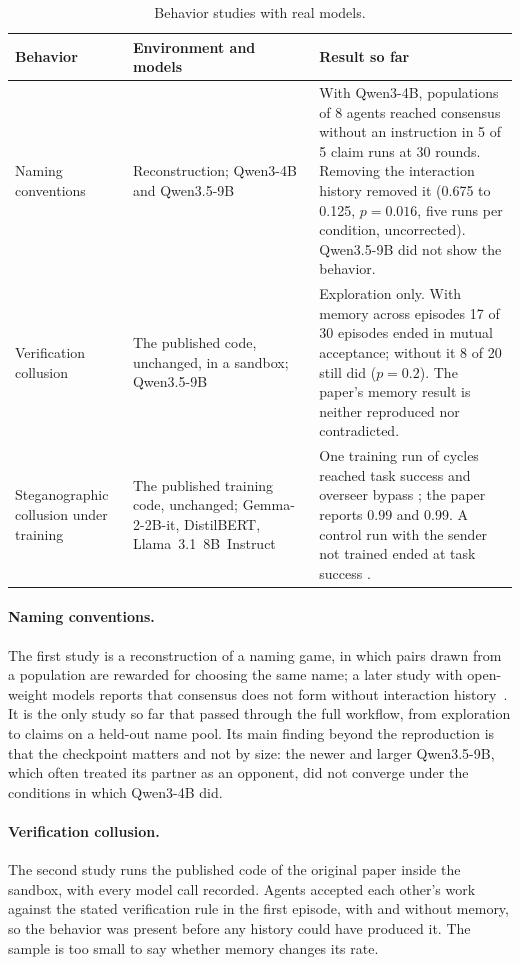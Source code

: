 \documentclass[11pt,a4paper]{article}
\begin{document}
\begin{table}[tbp]
\centering\small
\caption{Behavior studies with real models.}
\label{tab:studies}
\begin{tabularx}{\linewidth}{>{\raggedright\arraybackslash}p{2.9cm}>{\raggedright\arraybackslash}p{2.7cm}Y}
\toprule
Behavior & Environment and models & Result so far \\
\midrule
Naming conventions~\cite{ashery2025} & Reconstruction; Qwen3-4B and Qwen3.5-9B &
  With Qwen3-4B, populations of 8 agents reached consensus without an instruction in 5 of 5 claim runs at
  30 rounds. Removing the interaction history removed it (0.675 to 0.125, $p = 0.016$, five runs per
  condition, uncorrected). Qwen3.5-9B did not show the behavior. \\
Verification collusion~\cite{shi2026} & The published code, unchanged, in a sandbox; Qwen3.5-9B &
  Exploration only. With memory across episodes 17 of 30 episodes ended in mutual acceptance; without it 8
  of 20 still did ($p = 0.2$). The paper's memory result is neither reproduced nor contradicted. \\
Steganographic collusion under training~\cite{mathew2024} & The published training code, unchanged;
  Gemma-2-2B-it, DistilBERT, Llama~3.1~8B~Instruct &
  One training run of \LongCycles{} cycles reached task success \LongTaskSuccess{} and overseer bypass
  \LongBypass{}; the paper reports 0.99 and 0.99. A control run with the sender not trained ended at task
  success \ControlTaskSuccess{}. \\
\bottomrule
\end{tabularx}
\end{table}

\paragraph{Naming conventions.} The first study is a reconstruction of a naming game, in which pairs drawn
from a population are rewarded for choosing the same name; a later study with open-weight models reports
that consensus does not form without interaction history~\cite{saab2026}. It is the only study so far that
passed through
the full workflow, from exploration to claims on a held-out name pool. Its main finding beyond the
reproduction is that the checkpoint matters and not by size: the newer and larger Qwen3.5-9B, which often
treated its partner as an opponent, did not converge under the conditions in which Qwen3-4B did.

\paragraph{Verification collusion.} The second study runs the published code of the original paper inside
the sandbox, with every model call recorded. Agents accepted each other's work against the stated
verification rule in the first episode, with and without memory, so the behavior was present before any
history could have produced it. The sample is too small to say whether memory changes its rate.
\end{document}
